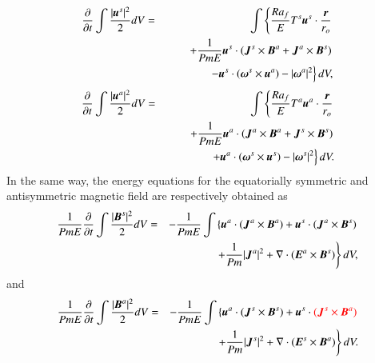 %
\begin{eqnarray}
\displaystyle
\frac{\partial}{\partial t}
 \int \frac{|\mbox{\boldmath$u$}^s|^2}{2} d V 
 &=& \int \left\{
      \frac{Ra_f}{E}T^s \mbox{\boldmath$u$}^s\cdot \frac{\mbox{\boldmath$r$}}{r_{o}}
     \right.
\nonumber \\
& & \displaystyle
\hspace*{2em}
     \left.
    + \frac{1}{Pm E} \mbox{\boldmath$u$}^s \cdot
                (\mbox{\boldmath$J$}^s \times \mbox{\boldmath$B$}^a
                +\mbox{\boldmath$J$}^a \times \mbox{\boldmath$B$}^s)
      \right.
\nonumber \\
& &\displaystyle
\hspace*{3em}
      \left.
    - \mbox{\boldmath$u$}^s \cdot 
       (\mbox{\boldmath$\omega$}^s \times \mbox{\boldmath$u$}^a)
    - |\mbox{\boldmath$\omega$}^a|^2 
      \right\} d V,
\label{eq:energy_us}
\end{eqnarray}
%
\begin{eqnarray}
\displaystyle
\frac{\partial}{\partial t}
 \int \frac{|\mbox{\boldmath$u$}^a|^2}{2} d V 
 & = & \displaystyle
\int \left\{
      \frac{Ra_f}{E}T^a \mbox{\boldmath$u$}^a\cdot \frac{\mbox{\boldmath$r$}}{r_{o}}
     \right.
\nonumber \\
& & \displaystyle
\hspace*{2em}
     \left.
    + \frac{1}{Pm E} \mbox{\boldmath$u$}^a \cdot
                (\mbox{\boldmath$J$}^a \times \mbox{\boldmath$B$}^a
                +\mbox{\boldmath$J$}^s \times \mbox{\boldmath$B$}^s)
      \right.
\nonumber \\
& & \displaystyle
\hspace*{3em}
      \left.
    + \mbox{\boldmath$u$}^a \cdot 
       (\mbox{\boldmath$\omega$}^s \times \mbox{\boldmath$u$}^s)
    - |\mbox{\boldmath$\omega$}^s|^2 
      \right\} d V.
\label{eq:energy_ua}
\end{eqnarray}
%
In the same way, the energy equations for the equatorially symmetric and antisymmetric magnetic field are respectively obtained as
%
\begin{eqnarray}
\displaystyle
\frac{1}{Pm E}\frac{\partial}{\partial t}
 \int \frac{|\mbox{\boldmath$B$}^s|^2}{2} d V
 & = & - \frac{1}{Pm E}\int \left\{
      \mbox{\boldmath$u$}^a \cdot 
          ( \mbox{\boldmath$J$}^a \times \mbox{\boldmath$B$}^a )
    + \mbox{\boldmath$u$}^s \cdot 
          ( \mbox{\boldmath$J$}^a \times \mbox{\boldmath$B$}^s )
    \right.
\nonumber \\
\hspace{3em}
&& \displaystyle
    \left.
    + \frac{1}{Pm} |\mbox{\boldmath$J$}^a|^2
    + \nabla \cdot ( \mbox{\boldmath$E$}^a \times \mbox{\boldmath$B$}^s ) 
      \right\} d V,
\label{eq:energy_Bs}
\end{eqnarray}
%
and 
%
\begin{eqnarray}
\displaystyle
\frac{1}{Pm E}\frac{\partial}{\partial t}
 \int \frac{|\mbox{\boldmath$B$}^a|^2}{2} d V 
& = & \displaystyle
- \frac{1}{Pm E}\int \left\{
      \mbox{\boldmath$u$}^a \cdot 
          ( \mbox{\boldmath$J$}^s \times \mbox{\boldmath$B$}^s )
    + \mbox{\boldmath$u$}^s \cdot 
{\color{red} (  \mbox{\boldmath$J$} ^s \times  \mbox{\boldmath$B$} ^a )}
    \right.
\nonumber \\
\hspace{3em}
 & & \displaystyle
    \left.
    + \frac{1}{Pm} |\mbox{\boldmath$J$}^s|^2
    + \nabla \cdot ( \mbox{\boldmath$E$}^s \times \mbox{\boldmath$B$}^a ) 
      \right\} d V.
\label{eq:energy_Ba}
\end{eqnarray}
